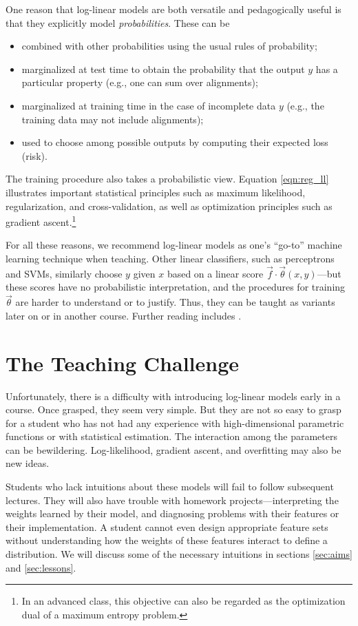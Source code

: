 \documentclass[11pt,letterpaper]{article}
\begin{document}
One reason that log-linear models are both versatile and pedagogically
useful is that they explicitly model {\em probabilities}.  These can be 
\begin{itemize}
\item combined with other probabilities using the usual rules of probability;
\item marginalized at test time to obtain the probability that the output 
  $y$ has a particular property (e.g., one can sum over alignments);
\item marginalized at training time in the case of incomplete data $y$
  (e.g., the training data may not include alignments);
\item used to choose among possible outputs by computing their 
  expected loss (risk).
\end{itemize}
The training procedure also takes a probabilistic view.  Equation
\eqref{eqn:reg_ll} illustrates important statistical principles such as maximum
likelihood, regularization, and cross-validation, as well as
optimization principles such as gradient ascent.\footnote{In an
  advanced class, this objective can also be regarded as the
  optimization dual of a maximum entropy problem.}

For all these reasons, we recommend log-linear models as one's
``go-to'' machine learning technique when teaching.  Other linear
classifiers, such as perceptrons and SVMs, similarly choose $y$ given
$x$ based on a linear score $\vec{f} \cdot \vec{\theta}(x,y)$---but
these scores have no probabilistic interpretation, and the procedures
for training $\vec{\theta}$ are harder to understand or to justify.
Thus, they can be taught as variants later on or in another course.
Further reading includes \cite{smith-2011}.

\section{The Teaching Challenge} \label{sec:challenges}

Unfortunately, there is a difficulty with introducing log-linear
models early in a course.  Once grasped, they seem very simple.  But
they are not so easy to grasp for a student who has not had any
experience with high-dimensional parametric functions or with
statistical estimation.  The interaction among the parameters can be
bewildering.  Log-likelihood, gradient ascent, and overfitting may also
be new ideas.

Students who lack intuitions about these models will fail to follow
subsequent lectures.  They will also have trouble with homework
projects---interpreting the weights learned by their model, and
diagnosing problems with their features or their implementation.  A
student cannot even design appropriate feature sets without
understanding how the weights of these features interact to define a
distribution.  We will discuss some of the necessary intuitions in
sections \ref{sec:aims} and \ref{sec:lessons}.
\end{document}
